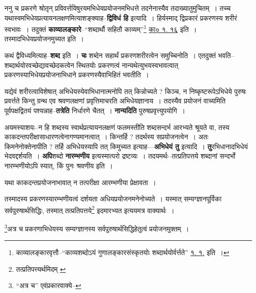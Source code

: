 \documentclass[article,12pt,a4paper]{memoir}
\begin{document}
	  \pstart ननु च प्रकरणे श्रोतृन् प्रविवर्त्तयिषुरयमभिधेयप्रयोजनमभिधत्ते तदनेनास्यैव तदाख्यातुमुचितम् । तच्च यथास्वमभिधेयप्रत्यायनलक्षणमित्याशङ्क्याह--\textbf{द्विविधं हि} इत्यादि । हिर्यस्माद् द्विप्रकारं प्रकरणस्य शरीरं स्वभावः । तदुक्तं \textbf{काव्यालङ्कारे}--“शब्दार्थौ सहितौ काव्यम्”\footnote{काव्यालङ्कारवृत्तौ--“काव्यशब्दोऽयं गुणालङ्कारसंस्कृतयोः शब्दार्थयोर्वर्त्तते” \href{http://http://sarit.indology.info/?cref=kāv.1.1}{ १. १.} इति ।} \href{http://http://sarit.indology.info/?cref=kā.1.16}{का० १. १६} इति । तस्मादभिधेयप्रयोजनमुच्यत इति ।
	\pend
      

	  \pstart कथं द्वैविध्यमित्याह--\textbf{शब्द} इति । \textbf{चः} शब्देन सहार्थं प्रकरणशरीरत्वेन समुच्चिनोति । एतदुक्तं भवति--शब्दार्थयोरवच्छेद्यावच्छेदकत्वेन स्थितयोः प्रकरणत्वं नान्यथेत्युभयस्वभावत्वात् प्रकरणस्याभिधेयप्रयोजनाभिधाने प्रकरणस्यैवाभिहितं भवतीति ।
	\pend
      

	  \pstart यद्येवं शरीरत्वाविशेषात् अभिधेयस्येवाभिधानात्मनोपि तत् किन्नोच्यते ? किञ्च, न निष्कृष्टरूपेऽभिधेये पुरुषः प्रवर्त्तते किन्तु ग्रन्थ एव श्रवणलक्षणां प्रवृत्तिमाचरति अभिधेयज्ञानाय । तदस्यैव प्रयोजनं वाच्यमिति पूर्वपक्षद्वितयं पश्यन्नाह--\textbf{तत्रेति} निर्धा\leavevmode{}रणे चैतत् । \textbf{नान्यदिति} पुरुषप्रवृत्त्युपयोगि ।
	\pend
      

	  \pstart अयमस्याशयः--न हि शब्दस्य स्वार्थप्रत्यायनलक्षणं फलमस्तीति शब्दसन्दर्भ आरभ्यते श्रूयते वा, तस्य काकदन्तपरीक्षासाधारणत्वेनागण्यमानत्वात् । किन्तर्हि ? तदर्थस्य सप्रयोजनत्वेन । अतः किमनेनोक्तेनापीति ? तर्हि अभिधेयस्यापि तत् किमुच्यत इत्याह—\textbf{अभिधेयं तु} इत्यादि । \textbf{तु}रभिधानादभिधेयं भेदवद्दर्शयति । \textbf{अपि}शब्दो \textbf{नारम्भणीय} इत्यस्मात्परो द्रष्टव्यः । तदयमर्थः--तत्प्रतिपत्तये शब्दानां सन्दर्भो नारम्भणीयोऽपि स्यात्, किं पुनः श्रवणीय इति ।
	\pend
	  \bigskip
	  \begingroup
	

	  \pstart यथा काकदन्तप्रयोजनाभावात् न तत्परीक्षा आरम्भणीया प्रेक्षावता ।
	\pend
       

	  \pstart तस्मादस्य प्रकरणस्यारम्भणीयत्वं दर्शयता अधियप्रयोजनमनेनोच्यते । यस्मात् सम्यग्ज्ञानपूर्विका सर्वपुरुषार्थसिद्धिः, तस्मात् तत्प्रतिपत्तये\footnote{तत्प्रतिपत्त्यर्थमिदम् \cite{dp-msA} \cite{dp-edE} \cite{dp-edN} \cite{dp-edH} \cite{dp-edP}} इदमारभ्यत इत्ययमत्र वाक्यार्थः ।
	\pend
       

	  \pstart \footnote{“अत्र च” एवंप्रकारवाक्ये--\cite{dp-msD-n}}\-अत्र च प्रकरणाभिधेयस्य सम्यग्ज्ञानस्य सर्वपुरुषार्थसिद्धिहेतुत्वं प्रयोजनमुक्तम् ।
	\pend
      
\end{document}
